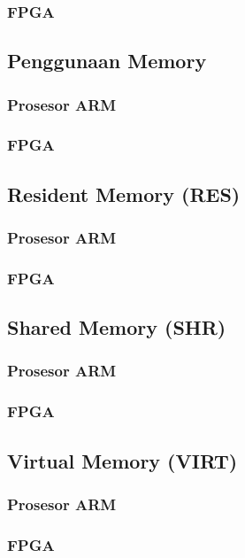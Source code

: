 \subsubsection{FPGA}

\subsection{Penggunaan Memory}
\blindtext
\subsubsection{Prosesor ARM}
\subsubsection{FPGA}

\subsection{Resident Memory (RES)}
\blindtext
\subsubsection{Prosesor ARM}
\subsubsection{FPGA}

\subsection{Shared Memory (SHR)}
\blindtext
\subsubsection{Prosesor ARM}
\subsubsection{FPGA}

\subsection{Virtual Memory (VIRT)}
\blindtext
\subsubsection{Prosesor ARM}
\subsubsection{FPGA}